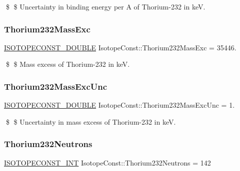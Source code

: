 \$ \$ Uncertainty in binding energy per A of Thorium-\/232 in keV. \mbox{\label{group___isotope_const-_thorium-_th232_ga3176e3204e69fe0406e62c10558d9396}} 
\subsubsection{\texorpdfstring{Thorium232\+Mass\+Exc}{Thorium232MassExc}}
{\footnotesize\ttfamily \mbox{\hyperlink{group___isotope_const-_macros_ga8f45a7272ce02c0b4c65c44636ed719a}{I\+S\+O\+T\+O\+P\+E\+C\+O\+N\+S\+T\+\_\+\+D\+O\+U\+B\+LE}} Isotope\+Const\+::\+Thorium232\+Mass\+Exc = 35446.}

\$ \$ Mass excess of Thorium-\/232 in keV. \mbox{\label{group___isotope_const-_thorium-_th232_ga88af8e0a7b7864be6e8582c16b45a5a1}} 
\subsubsection{\texorpdfstring{Thorium232\+Mass\+Exc\+Unc}{Thorium232MassExcUnc}}
{\footnotesize\ttfamily \mbox{\hyperlink{group___isotope_const-_macros_ga8f45a7272ce02c0b4c65c44636ed719a}{I\+S\+O\+T\+O\+P\+E\+C\+O\+N\+S\+T\+\_\+\+D\+O\+U\+B\+LE}} Isotope\+Const\+::\+Thorium232\+Mass\+Exc\+Unc = 1.}

\$ \$ Uncertainty in mass excess of Thorium-\/232 in keV. \mbox{\label{group___isotope_const-_thorium-_th232_ga0959669b3152baa562598ebeeb8faa22}} 
\subsubsection{\texorpdfstring{Thorium232\+Neutrons}{Thorium232Neutrons}}
{\footnotesize\ttfamily \mbox{\hyperlink{group___isotope_const-_macros_ga5f18360b3e99483a35c32d789e62621c}{I\+S\+O\+T\+O\+P\+E\+C\+O\+N\+S\+T\+\_\+\+I\+NT}} Isotope\+Const\+::\+Thorium232\+Neutrons = 142}

